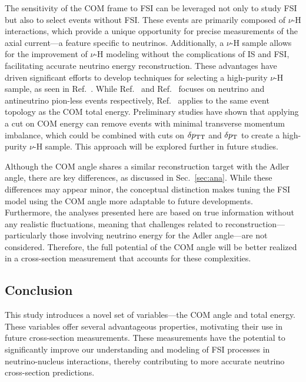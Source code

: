      The sensitivity of the COM frame to FSI can be leveraged not only to study FSI but also to select events without FSI. 
     These events are primarily composed of $\nu$-H interactions, which provide a unique opportunity for precise measurements of the axial current—a feature specific to neutrinos. 
     Additionally, a $\nu$-H sample allows for the improvement of $\nu$-H modeling without the complications of IS and FSI, facilitating accurate neutrino energy reconstruction. 
     These advantages have driven significant efforts to develop techniques for selecting a high-purity $\nu$-H sample, as seen in Ref.~\cite{Lu:2015hea,MINERvA:2023avz,Baudis:2023tma}.
     While Ref.~\cite{Baudis:2023tma} and Ref.~\cite{MINERvA:2023avz} focuses on neutrino and antineutrino pion-less events respectively, Ref.~\cite{Lu:2015hea} applies to the same event topology as the COM total energy. 
     Preliminary studies have shown that applying a cut on COM energy can remove events with minimal transverse momentum imbalance, which could be combined with cuts on $\delta p_\textrm{TT}$ and $\delta p_\textrm{T}$ to create a high-purity $\nu$-H sample. 
     This approach will be explored further in future studies.

     Although the COM angle shares a similar reconstruction target with the Adler angle, there are key differences, as discussed in Sec.~\ref{sec:ana}. 
     While these differences may appear minor, the conceptual distinction makes tuning the FSI model using the COM angle more adaptable to future developments. 
     Furthermore, the analyses presented here are based on true information without any realistic fluctuations, meaning that challenges related to reconstruction—particularly those involving neutrino energy for the Adler angle—are not considered. 
     Therefore, the full potential of the COM angle will be better realized in a cross-section measurement that accounts for these complexities.

     \subsection{Conclusion}
     This study introduces a novel set of variables—the COM angle and total energy.
     These variables offer several advantageous properties, motivating their use in future cross-section measurements.
     These measurements have the potential to significantly improve our understanding and modeling of FSI processes in neutrino-nucleus interactions, thereby contributing to more accurate neutrino cross-section predictions.

